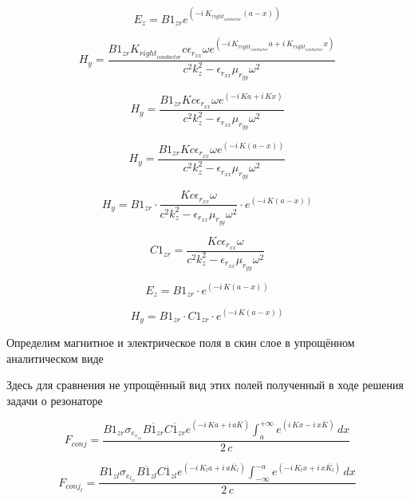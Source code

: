 \documentclass[11pt]{article}
\begin{document}
\[E_z = \mathit{B1}_{\mathit{zr}} e^{\left(-i \, K_{\mathit{right}_{\mathit{conductor}}} {\left(a - x\right)}\right)}\]

    \[H_y = \frac{\mathit{B1}_{\mathit{zr}} K_{\mathit{right}_{\mathit{conductor}}} c \epsilon_{r_{\mathit{xx}}} \omega e^{\left(-i \, K_{\mathit{right}_{\mathit{conductor}}} a + i \, K_{\mathit{right}_{\mathit{conductor}}} x\right)}}{c^{2} k_{z}^{2} - \epsilon_{r_{\mathit{xx}}} \mu_{r_{\mathit{yy}}} \omega^{2}}\]

    \[H_y = \frac{\mathit{B1}_{\mathit{zr}} K c \epsilon_{r_{\mathit{xx}}} \omega e^{\left(-i \, K a + i \, K x\right)}}{c^{2} k_{z}^{2} - \epsilon_{r_{\mathit{xx}}} \mu_{r_{\mathit{yy}}} \omega^{2}}\]

    \[H_y = \frac{\mathit{B1}_{\mathit{zr}} K c \epsilon_{r_{\mathit{xx}}} \omega e^{\left(-i \, K {\left(a - x\right)}\right)}}{c^{2} k_{z}^{2} - \epsilon_{r_{\mathit{xx}}} \mu_{r_{\mathit{yy}}} \omega^{2}}\]

    \[H_y = \mathit{B1}_{\mathit{zr}} \cdot \frac{ K c \epsilon_{r_{\mathit{xx}}} \omega }{c^{2} k_{z}^{2} - \epsilon_{r_{\mathit{xx}}} \mu_{r_{\mathit{yy}}} \omega^{2}} \cdot e^{\left(-i \, K {\left(a - x\right)}\right)}\]

    \[C1_{zr} = \frac{ K c \epsilon_{r_{\mathit{xx}}} \omega }{c^{2} k_{z}^{2} - \epsilon_{r_{\mathit{xx}}} \mu_{r_{\mathit{yy}}} \omega^{2}}\]

    \[E_z = \mathit{B1}_{\mathit{zr}} \cdot  e^{\left(-i \, K {\left(a - x\right)}\right)}\]

    \[H_y = \mathit{B1}_{\mathit{zr}} \cdot C1_{zr} \cdot e^{\left(-i \, K {\left(a - x\right)}\right)}\]

    Определим магнитное и электрическое поля в скин слое в упрощённом
аналитическом виде

    Здесь для сравнения не упрощённый вид этих полей полученный в ходе
решения задачи о резонаторе

    \[F_{conj} = \frac{\mathit{B1}_{\mathit{zr}} \sigma_{e_{r_{\mathit{zz}}}} \overline{\mathit{B1}_{\mathit{zr}}} \overline{\mathit{C1}_{\mathit{zr}}} e^{\left(-i \, K a + i \, a \overline{K}\right)} \int_{a}^{+\infty} e^{\left(i \, K x - i \, x \overline{K}\right)}\,{d x}}{2 \, c}\]

    \[F_{conj_l} = \frac{\mathit{B1}_{\mathit{zl}} \sigma_{e_{l_{\mathit{zz}}}} \overline{\mathit{B1}_{\mathit{zl}}} \overline{\mathit{C1}_{\mathit{zl}}} e^{\left(-i \, K_{l} a + i \, a \overline{K_{l}}\right)} \int_{-\infty}^{-a} e^{\left(-i \, K_{l} x + i \, x \overline{K_{l}}\right)}\,{d x}}{2 \, c}\]
\end{document}
